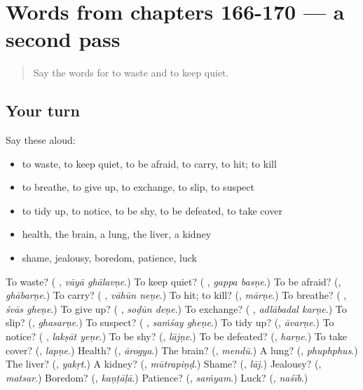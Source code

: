 \section[(dialogue)]{Words from chapters 166-170 — a second pass}

\label{lesson:MR-R170-second-pass-words-from-chapters-166-170}



\begin{quote}
Say the words for to waste and to keep quiet.
\end{quote}

\subsection*{Your turn}
Say these aloud:

\begin{itemize}
\raggedright
  \item to waste, to keep quiet, to be afraid, to carry, to hit; to kill
  \item to breathe, to give up, to exchange, to slip, to suspect
  \item to tidy up, to notice, to be shy, to be defeated, to take cover
  \item health, the brain, a lung, the liver, a kidney
  \item shame, jealousy, boredom, patience, luck
\end{itemize}

\begin{tcolorbox}[breakable,colback=teal!4,colframe=teal!35!black,title={Before you move on}]
To waste? (\textbf{ }, \emph{vāyā ghālavṇe}.) To keep quiet? (\textbf{ }, \emph{gappa basṇe}.) To be afraid? (\textbf{}, \emph{ghābarṇe}.) To carry? (\textbf{ }, \emph{vāhūn neṇe}.) To hit; to kill? (\textbf{}, \emph{mārṇe}.) To breathe? (\textbf{ }, \emph{śvās gheṇe}.) To give up? (\textbf{ }, \emph{soḍūn deṇe}.) To exchange? (\textbf{ }, \emph{adlābadal karṇe}.) To slip? (\textbf{}, \emph{ghasarṇe}.) To suspect? (\textbf{ }, \emph{saṁśay gheṇe}.) To tidy up? (\textbf{}, \emph{āvarṇe}.) To notice? (\textbf{ }, \emph{lakṣāt yeṇe}.) To be shy? (\textbf{}, \emph{lājṇe}.) To be defeated? (\textbf{}, \emph{harṇe}.) To take cover? (\textbf{}, \emph{lapṇe}.) Health? (\textbf{}, \emph{ārogya}.) The brain? (\textbf{}, \emph{mendū}.) A lung? (\textbf{}, \emph{phuphphus}.) The liver? (\textbf{}, \emph{yakṛt}.) A kidney? (\textbf{}, \emph{mūtrapiṇḍ}.) Shame? (\textbf{}, \emph{lāj}.) Jealousy? (\textbf{}, \emph{matsar}.) Boredom? (\textbf{}, \emph{kaṇṭāḷā}.) Patience? (\textbf{}, \emph{saṁyam}.) Luck? (\textbf{}, \emph{naśīb}.)
\end{tcolorbox}
